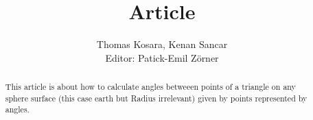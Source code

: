 \documentclass[12pt, a4paper, twoside, titlepage]{article}
\title{Article}
\author{Thomas Kosara, Kenan Sancar\\Editor: Patick-Emil Zörner}
\begin{document}
\maketitle
\begin{abstract}
    This article is about how to calculate angles betweeen points of a triangle on any sphere surface (this case earth but Radius irrelevant) given by points represented by angles.
\end{abstract}


\end{document}

